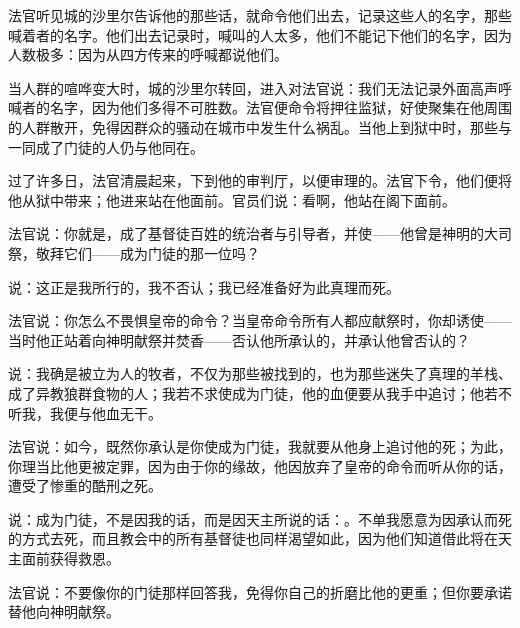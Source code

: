 法官听见城的沙里尔告诉他的那些话，就命令他们出去，记录这些人的名字，那些喊着者的名字。他们出去记录时，喊叫的人太多，他们不能记下他们的名字，因为人数极多：因为从四方传来的呼喊都说他们。\par

当人群的喧哗变大时，城的沙里尔转回，进入对法官说：我们无法记录外面高声呼喊者的名字，因为他们多得不可胜数。法官便命令将押往监狱，好使聚集在他周围的人群散开，免得因群众的骚动在城市中发生什么祸乱。当他上到狱中时，那些与一同成了门徒的人仍与他同在。\par

过了许多日，法官清晨起来，下到他的审判厅，以便审理的。法官下令，他们便将他从狱中带来；他进来站在他面前。官员们说：看啊，他站在阁下面前。\par

法官说：你就是，成了基督徒百姓的统治者与引导者，并使——他曾是神明的大司祭，敬拜它们——成为门徒的那一位吗？\par

说：这正是我所行的，我不否认；我已经准备好为此真理而死。\par

法官说：你怎么不畏惧皇帝的命令？当皇帝命令所有人都应献祭时，你却诱使——当时他正站着向神明献祭并焚香——否认他所承认的，并承认他曾否认的？\par

说：我确是被立为人的牧者，不仅为那些被找到的，也为那些迷失了真理的羊栈、成了异教狼群食物的人；我若不求使成为门徒，他的血便要从我手中追讨；他若不听我，我便与他血无干。\par

法官说：如今，既然你承认是你使成为门徒，我就要从他身上追讨他的死；为此，你理当比他更被定罪，因为由于你的缘故，他因放弃了皇帝的命令而听从你的话，遭受了惨重的酷刑之死。\par

说：成为门徒，不是因我的话，而是因天主所说的话：。不单我愿意为因承认而死的方式去死，而且教会中的所有基督徒也同样渴望如此，因为他们知道借此将在天主面前获得救恩。\par

法官说：不要像你的门徒那样回答我，免得你自己的折磨比他的更重；但你要承诺替他向神明献祭。\par

